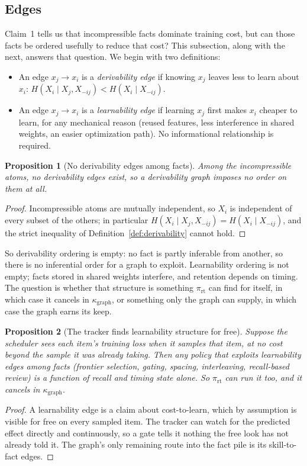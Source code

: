 \documentclass[11pt]{article}
\theoremstyle{plain}
\newtheorem{proposition}{Proposition}
\theoremstyle{definition}
\theoremstyle{remark}
\begin{document}
\subsection{Edges}
\label{sec:edges}

Claim~1 tells us that incompressible facts dominate training cost, but can those facts be ordered usefully to reduce that cost? This subsection, along with the next, answers that question. We begin with two definitions:
\begin{itemize}
\item An edge $x_j\to x_i$ is a \textit{derivability edge} if knowing $x_j$ leaves less to learn about $x_i$:
$H(X_i\mid X_j,X_{-ij})<H(X_i\mid X_{-ij})$.
\item An edge $x_j\to x_i$ is a \textit{learnability edge} if learning $x_j$ first makes $x_i$ cheaper to learn, for any mechanical reason
(reused features, less interference in shared weights, an easier optimization path). No
informational relationship is required.
\end{itemize}

\begin{proposition}[No derivability edges among facts]
\label{prop:deriv}
Among the incompressible atoms, no derivability edges exist, so a derivability graph imposes no
order on them at all.
\end{proposition}
\begin{proof}
Incompressible atoms are mutually independent, so $X_i$ is independent of every subset of the
others; in particular $H(X_i\mid X_j,X_{-ij})=H(X_i\mid X_{-ij})$, and the strict inequality of
Definition~\ref{def:derivability} cannot hold.
\end{proof}

So derivability ordering is empty: no fact is partly inferable from another, so there is no
inferential order for a graph to exploit. Learnability ordering is not empty; facts stored in shared
weights interfere, and retention depends on timing. The question is whether that structure is
something $\pi_{\mathrm{rt}}$ can find for itself, in which case it cancels in
$\kappa_{\mathrm{graph}}$, or something only the graph can supply, in which case the graph earns its
keep.

\begin{proposition}[The tracker finds learnability structure for free]
\label{prop:learn}
Suppose the scheduler sees each item's training loss when it samples that item, at no cost beyond
the sample it was already taking. Then any policy that exploits learnability edges among facts
(frontier selection, gating, spacing, interleaving, recall-based review) is a function of recall and
timing state alone. So $\pi_{\mathrm{rt}}$ can run it too, and it cancels in $\kappa_{\mathrm{graph}}$.
\end{proposition}
\begin{proof}
A learnability edge is a claim about cost-to-learn, which by assumption is visible for free on every
sampled item. The tracker can watch for the predicted effect directly and continuously, so a gate
tells it nothing the free look has not already told it. The graph's only remaining route into the
fact pile is its skill-to-fact edges.
\end{proof}
\end{document}
